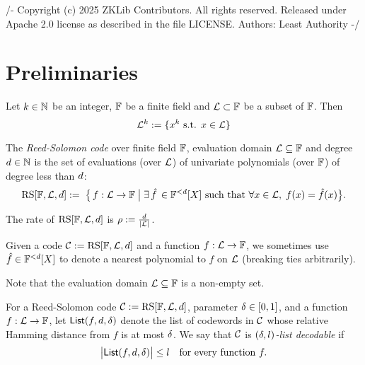 /-
Copyright (c) 2025 ZKLib Contributors. All rights reserved.
Released under Apache 2.0 license as described in the file LICENSE.
Authors: Least Authority
-/

\chapter{Preliminaries}


\begin{definition}\label{def:smooth_dom}
\leanok
    Let $k\in \mathbb{N}$ be an integer, $\mathbb{F}$ be a finite field and $\mathcal{L} \subset \mathbb{F}$ be a subset of $\mathbb{F}$. Then 
    \[
    \mathcal{L}^k := \{x^k \text{ s.t. } x \in \mathcal{L}\}
    \]   
\end{definition}

\begin{definition}\label{def:rscode}
\leanok
{}
    The \emph{Reed-Solomon code} over finite field $\mathbb{F}$, evaluation domain $\mathcal{L}\subseteq\mathbb{F}$ and degree $d\in\mathbb{N}$ is the set of evaluations (over $\mathcal{L}$) of univariate polynomials (over $\mathbb{F}$) of degree less than $d$:
    \[
        \mathrm{RS}[\mathbb{F},\mathcal{L},d]:=\; \bigl\{\, f : \mathcal{L} \to \mathbb{F} \;\big|\; \exists \,\hat{f} \,\in \mathbb{F}^{<d}[X]\text{ such that } \forall x \in \mathcal{L},\; f(x) = \hat{f}(x)\bigr\}.
    \]

    The rate of $\mathrm{RS}[\mathbb{F},\mathcal{L},d]$ is $\rho := \frac{d}{\lvert \mathcal{L} \rvert}$.

    Given a code $\mathcal{C} := \mathrm{RS}[\mathbb{F},\mathcal{L},d]$ and a function $f : \mathcal{L} \to \mathbb{F}$, we sometimes use $\hat{f} \in \mathbb{F}^{<d}[X]$ to denote a nearest polynomial to $f$ on $\mathcal{L}$ (breaking ties arbitrarily).
\end{definition}

\begin{remark}
Note that the evaluation domain $\mathcal{L}\subseteq\mathbb{F}$ is a non-empty set.
\end{remark}

\begin{definition}\label{def:list_decodable}
\leanok
{}
    For a Reed-Solomon code $\mathcal{C} := \mathrm{RS}[\mathbb{F},\mathcal{L},d]$, parameter $\delta \in [0,1]$, 
    and a function $f:\mathcal{L}\to\mathbb{F}$, let $\mathsf{List}(f,d,\delta)$ denote the list 
    of codewords in $\mathcal{C}$ whose relative Hamming distance from $f$ is at most $\delta$.
    We say that $\mathcal{C}$ is \emph{$(\delta,l)$-list decodable} if 
    \[
    \bigl|\mathsf{List}(f,d,\delta)\bigr| \leq l
    \quad
    \text{for every function } f.
    \]
\end{definition}
    

